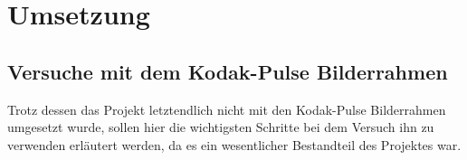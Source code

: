 \chapter{ Umsetzung }\label{chap:Umsetzung}
\vspace*{-3cm}
\begin{flushleft}
\section{Versuche mit dem Kodak-Pulse Bilderrahmen}
  Trotz dessen das Projekt letztendlich nicht mit den Kodak-Pulse Bilderrahmen umgesetzt wurde, sollen hier die wichtigsten Schritte bei dem Versuch ihn zu verwenden erläutert werden, da es ein wesentlicher Bestandteil des Projektes war.

\end{flushleft}
